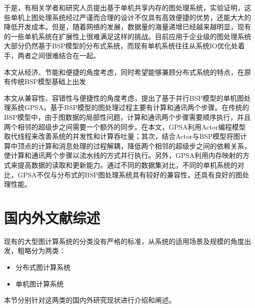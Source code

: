于是，有相关学者和研究人员提出基于单机共享内存的图处理系统，实验证明，这些单机上图处理系统经过严谨而合理的设计不仅具有高效便捷的优势，还能大大的降低开发成本。但是，随着网络的发展，数据量的海量递增已经越来越明显，现有的一些单机系统在扩展性上很难满足这样的挑战。目前应用于企业级的图处理系统大部分仍然基于BSP模型的分布式系统，而现有单机系统往往从系统IO优化处着手，两者之间很难结合在一起。

本文从经济、节能和便捷的角度考虑，同时希望能够兼顾分布式系统的特点，在原有传统BSP模型基础上出发

本文从兼容性、容错性与便捷性的角度考虑，提出了基于并行BSP模型的单机图处理系统GPSA。基于BSP模型的图处理过程主要有计算和通讯两个步骤。在传统的BSP模型中，由于图数据的局部性问题，计算和通讯两个步骤需要顺序执行，并且两个相邻的超级步之间需要一个额外的同步。在本文，GPSA利用Actor编程模型取代线程来改善系统的并发性和计算吞吐量；其次，结合Actor与BSP模型将图计算中顶点的计算和消息处理的过程解耦，降低两个相邻的超级步之间的依赖关系，使计算和通讯两个步骤以流水线的方式并行执行。另外，GPSA利用内存映射的方式来提高数据的读取和更新能力。通过不同的数据集对比，不同的单机系统的对比，GPSA不仅与分布式的BSP图处理系统具有较好的兼容性，还具有良好的图处理性能。

\section{国内外文献综述}
现有的大型图计算系统的分类没有严格的标准，从系统的适用场景及规模的角度出发，粗略分为两类：
\begin{itemize}
\item 分布式图计算系统
\item 单机图计算系统
\end{itemize}
本节分别针对这两类的国内外研究现状进行介绍和阐述。

